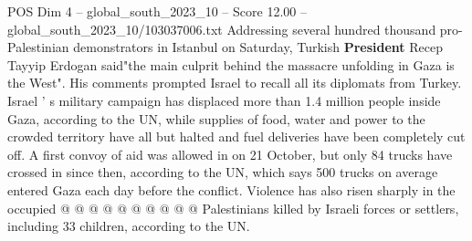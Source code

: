 \begin{textsample}{POS Dim 4 – global\_south\_2023\_10 – Score 12.00 – global\_south\_2023\_10/103037006.txt}
Addressing several hundred thousand pro-Palestinian demonstrators in Istanbul on Saturday, Turkish \textbf{President} Recep Tayyip Erdogan said"the main culprit behind the massacre unfolding in Gaza is the West".
His comments prompted Israel to recall all its diplomats from Turkey.
Israel ' s military campaign has displaced more than 1.4 million people inside Gaza, according to the UN, while supplies of food, water and power to the crowded territory have all but halted and fuel deliveries have been completely cut off.
A first convoy of aid was allowed in on 21 October, but only 84 trucks have crossed in since then, according to the UN, which says 500 trucks on average entered Gaza each day before the conflict.
Violence has also risen sharply in the occupied @ @ @ @ @ @ @ @ @ @ Palestinians killed by Israeli forces or settlers, including 33 children, according to the UN.

\end{textsample}
